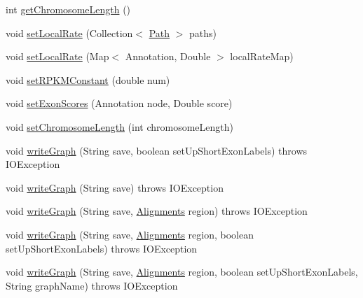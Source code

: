 \begin{DoxyCompactItemize}
\item 
int \hyperlink{classbroad_1_1pda_1_1seq_1_1graph_1_1_chromosome_with_bubbles_j_graph_t_a58e438f245b1e95a11dd93e38c611f49}{get\+Chromosome\+Length} ()
\item 
void \hyperlink{classbroad_1_1pda_1_1seq_1_1graph_1_1_chromosome_with_bubbles_j_graph_t_a5255b57645f44f82c704a21f6e6932f9}{set\+Local\+Rate} (Collection$<$ \hyperlink{classbroad_1_1pda_1_1seq_1_1graph_1_1_path}{Path} $>$ paths)
\item 
void \hyperlink{classbroad_1_1pda_1_1seq_1_1graph_1_1_chromosome_with_bubbles_j_graph_t_a053a45485376c1cb877c7f5d9266dcb8}{set\+Local\+Rate} (Map$<$ Annotation, Double $>$ local\+Rate\+Map)
\item 
void \hyperlink{classbroad_1_1pda_1_1seq_1_1graph_1_1_chromosome_with_bubbles_j_graph_t_a6c445a5adf8ec62e7b16f024a561b222}{set\+R\+P\+K\+M\+Constant} (double num)
\item 
void \hyperlink{classbroad_1_1pda_1_1seq_1_1graph_1_1_chromosome_with_bubbles_j_graph_t_ad0922edaa38d4478835466e3bb2a9cbc}{set\+Exon\+Scores} (Annotation node, Double score)
\item 
void \hyperlink{classbroad_1_1pda_1_1seq_1_1graph_1_1_chromosome_with_bubbles_j_graph_t_ab396983719c5ddc6d2cd9ce108b131ea}{set\+Chromosome\+Length} (int chromosome\+Length)
\item 
void \hyperlink{classbroad_1_1pda_1_1seq_1_1graph_1_1_chromosome_with_bubbles_j_graph_t_a681e4b8694942aa7549a13cf1ae17860}{write\+Graph} (String save, boolean set\+Up\+Short\+Exon\+Labels)  throws I\+O\+Exception
\item 
void \hyperlink{classbroad_1_1pda_1_1seq_1_1graph_1_1_chromosome_with_bubbles_j_graph_t_a976419a5dce3edbd55467820fbc8943e}{write\+Graph} (String save)  throws I\+O\+Exception
\item 
void \hyperlink{classbroad_1_1pda_1_1seq_1_1graph_1_1_chromosome_with_bubbles_j_graph_t_aae04a03e6e6a8131c5af4bbe91a813e8}{write\+Graph} (String save, \hyperlink{classbroad_1_1pda_1_1datastructures_1_1_alignments}{Alignments} region)  throws I\+O\+Exception 
\item 
void \hyperlink{classbroad_1_1pda_1_1seq_1_1graph_1_1_chromosome_with_bubbles_j_graph_t_a90d2753376f6aad44e9da33c12083875}{write\+Graph} (String save, \hyperlink{classbroad_1_1pda_1_1datastructures_1_1_alignments}{Alignments} region, boolean set\+Up\+Short\+Exon\+Labels)  throws I\+O\+Exception 
\item 
void \hyperlink{classbroad_1_1pda_1_1seq_1_1graph_1_1_chromosome_with_bubbles_j_graph_t_a9ef14344582b93bdaf0415e244cd0b7c}{write\+Graph} (String save, \hyperlink{classbroad_1_1pda_1_1datastructures_1_1_alignments}{Alignments} region, boolean set\+Up\+Short\+Exon\+Labels, String graph\+Name)  throws I\+O\+Exception 
\end{DoxyCompactItemize}


